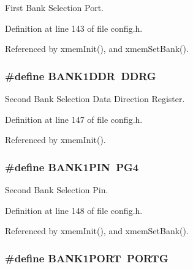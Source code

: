 First Bank Selection Port. 



Definition at line 143 of file config.\-h.



Referenced by xmem\-Init(), and xmem\-Set\-Bank().

\hypertarget{group__config_gada13cb9312072b48628763a6e1fd50d3}{
\subsubsection[{B\-A\-N\-K1\-D\-D\-R}]{\setlength{\rightskip}{0pt plus 5cm}\#define B\-A\-N\-K1\-D\-D\-R~D\-D\-R\-G}}\label{group__config_gada13cb9312072b48628763a6e1fd50d3}


Second Bank Selection Data Direction Register. 



Definition at line 147 of file config.\-h.



Referenced by xmem\-Init().

\hypertarget{group__config_gacfebedc2067e3c52e6ae1f627afcc1e1}{
\subsubsection[{B\-A\-N\-K1\-P\-I\-N}]{\setlength{\rightskip}{0pt plus 5cm}\#define B\-A\-N\-K1\-P\-I\-N~P\-G4}}\label{group__config_gacfebedc2067e3c52e6ae1f627afcc1e1}


Second Bank Selection Pin. 



Definition at line 148 of file config.\-h.



Referenced by xmem\-Init(), and xmem\-Set\-Bank().

\hypertarget{group__config_ga8b3ee7126196f6e939989eae097c3ac4}{
\subsubsection[{B\-A\-N\-K1\-P\-O\-R\-T}]{\setlength{\rightskip}{0pt plus 5cm}\#define B\-A\-N\-K1\-P\-O\-R\-T~P\-O\-R\-T\-G}}\label{group__config_ga8b3ee7126196f6e939989eae097c3ac4}


